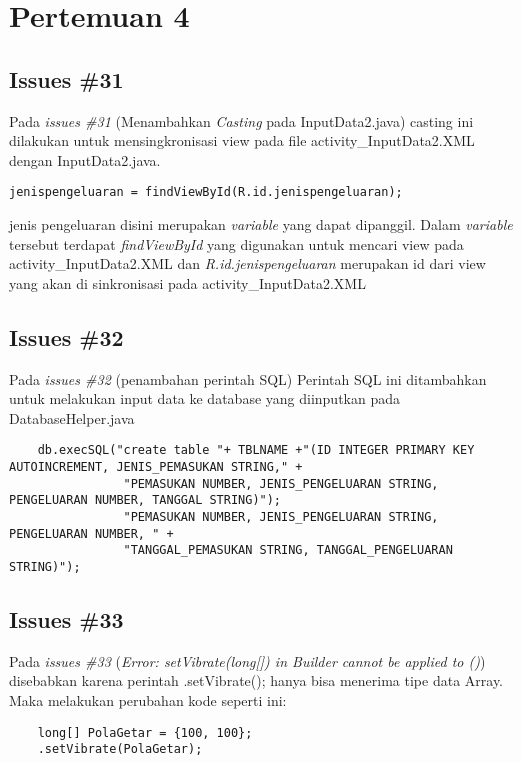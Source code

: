 \chapter{Pertemuan 4}

\section{Issues \#31}
Pada \textit{issues \#31} (Menambahkan \textit{Casting} pada InputData2.java) casting ini dilakukan untuk mensingkronisasi view pada file activity\_InputData2.XML dengan InputData2.java.
\begin{verbatim}
jenispengeluaran = findViewById(R.id.jenispengeluaran);
\end{verbatim}
jenis pengeluaran disini merupakan \textit{variable} yang dapat dipanggil. Dalam \textit{variable} tersebut terdapat \textit{findViewById} yang digunakan untuk mencari view pada activity\_InputData2.XML dan \textit{R.id.jenispengeluaran} merupakan id dari view yang akan di sinkronisasi pada activity\_InputData2.XML

\section{Issues \#32} 
Pada \textit{issues \#32} (penambahan perintah SQL) Perintah SQL ini ditambahkan untuk melakukan input data ke database yang diinputkan pada DatabaseHelper.java
\begin{verbatim}
    db.execSQL("create table "+ TBLNAME +"(ID INTEGER PRIMARY KEY AUTOINCREMENT, JENIS_PEMASUKAN STRING," +
                "PEMASUKAN NUMBER, JENIS_PENGELUARAN STRING, PENGELUARAN NUMBER, TANGGAL STRING)");
                "PEMASUKAN NUMBER, JENIS_PENGELUARAN STRING, PENGELUARAN NUMBER, " +
                "TANGGAL_PEMASUKAN STRING, TANGGAL_PENGELUARAN STRING)"); 
\end{verbatim}

\section{Issues \#33}
Pada \textit{issues \#33} (\textit{Error: setVibrate(long[]) in Builder cannot be applied to ()}) disebabkan karena perintah .setVibrate(); hanya bisa menerima tipe data Array. Maka melakukan perubahan kode seperti ini:
\begin{verbatim}
    long[] PolaGetar = {100, 100};
    .setVibrate(PolaGetar);
\end{verbatim}

